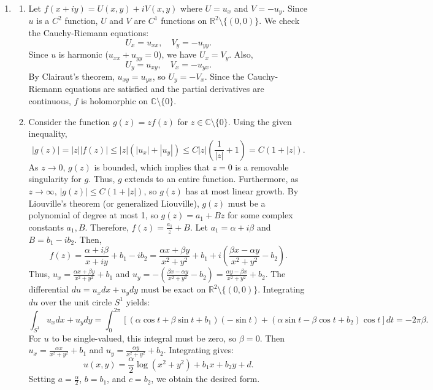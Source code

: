 \documentclass{article}
\begin{document}
\begin{enumerate}[label=\fbox{\arabic*}]
  \item %
        \begin{enumerate}[label=(\arabic*)]
          \item Let $f(x+iy) = U(x, y) + i V(x, y)$ where $U = u_x$ and $V = -u_y$. Since $u$ is a $C^2$ function, $U$ and $V$ are $C^1$ functions on $\mathbb{R}^2 \setminus \{(0,0)\}$. We check the Cauchy-Riemann equations:
                \[
                  U_x = u_{xx}, \quad V_y = -u_{yy}.
                \]
                Since $u$ is harmonic ($u_{xx} + u_{yy} = 0$), we have $U_x = V_y$. Also,
                \[
                  U_y = u_{xy}, \quad V_x = -u_{yx}.
                \]
                By Clairaut's theorem, $u_{xy} = u_{yx}$, so $U_y = -V_x$. Since the Cauchy-Riemann equations are satisfied and the partial derivatives are continuous, $f$ is holomorphic on $\mathbb{C} \setminus \{0\}$.
          \item Consider the function $g(z) = z f(z)$ for $z \in \mathbb{C} \setminus \{0\}$. Using the given inequality,
                \[
                  |g(z)| = |z| |f(z)| \le |z| \left( |u_x| + |u_y| \right) \le C|z| \left( \frac{1}{|z|} + 1 \right) = C(1 + |z|).
                \]
                As $z \to 0$, $g(z)$ is bounded, which implies that $z=0$ is a removable singularity for $g$. Thus, $g$ extends to an entire function. Furthermore, as $z \to \infty$, $|g(z)| \le C(1+|z|)$, so $g(z)$ has at most linear growth. By Liouville's theorem (or generalized Liouville), $g(z)$ must be a polynomial of degree at most 1, so $g(z) = a_1 + B z$ for some complex constants $a_1, B$.
                Therefore, $f(z) = \frac{a_1}{z} + B$.
                Let $a_1 = \alpha + i \beta$ and $B = b_1 - i b_2$. Then,
                \[
                  f(z) = \frac{\alpha + i \beta}{x + iy} + b_1 - i b_2 = \frac{\alpha x + \beta y}{x^2+y^2} + b_1 + i \left( \frac{\beta x - \alpha y}{x^2+y^2} - b_2 \right).
                \]
                Thus, $u_x = \frac{\alpha x + \beta y}{x^2+y^2} + b_1$ and $u_y = -\left( \frac{\beta x - \alpha y}{x^2+y^2} - b_2 \right) = \frac{\alpha y - \beta x}{x^2+y^2} + b_2$.
                The differential $du = u_x dx + u_y dy$ must be exact on $\mathbb{R}^2 \setminus \{(0,0)\}$. Integrating $du$ over the unit circle $S^1$ yields:
                \[
                  \int_{S^1} u_x dx + u_y dy = \int_0^{2\pi} \left[ (\alpha \cos t + \beta \sin t + b_1)(-\sin t) + (\alpha \sin t - \beta \cos t + b_2)\cos t \right] dt = -2\pi \beta.
                \]
                For $u$ to be single-valued, this integral must be zero, so $\beta = 0$.
                Then $u_x = \frac{\alpha x}{x^2+y^2} + b_1$ and $u_y = \frac{\alpha y}{x^2+y^2} + b_2$. Integrating gives:
                \[
                  u(x,y) = \frac{\alpha}{2} \log(x^2+y^2) + b_1 x + b_2 y + d.
                \]
                Setting $a = \frac{\alpha}{2}$, $b = b_1$, and $c = b_2$, we obtain the desired form.
        \end{enumerate}


\end{enumerate}
\end{document}
